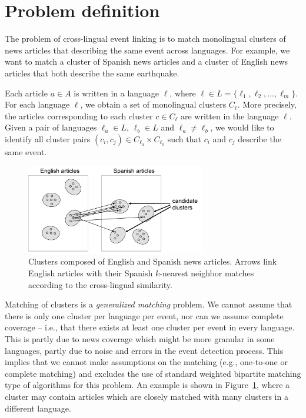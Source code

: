 \section{Problem definition}

The problem of cross-lingual event linking is to match monolingual clusters of news articles
that describing the same event across languages. For example, we want to match a cluster of
Spanish news articles and a cluster of English news articles that both describe the same earthquake.

Each article $a \in A$ is written in a language $\ell$, where $\ell \in L = \{\ell_1,\ell_2,...,\ell_m\}$.
For each language $\ell$, we obtain a set of monolingual clusters $C_{\ell}$. More precisely,
the articles corresponding to each cluster $c \in C_{\ell}$ are written in the language $\ell$.
Given a pair of languages $\ell_a \in L$, $\ell_b \in L$ and $\ell_a \not= \ell_b$, we would like
to identify all cluster pairs $(c_i, c_j) \in C_{\ell_a} \times C_{\ell_b}$ such that $c_i$ and $c_j$ describe the same event.

\begin{figure}[tb]
\centering
\includegraphics[width=0.7\textwidth]{figures/clusters.pdf}
\caption{\label{fig:clusters} Clusters composed of English and Spanish news articles. Arrows link English articles with their Spanish $k$-nearest neighbor matches according to the cross-lingual similarity.}
\end{figure}

Matching of clusters is a \emph{generalized matching} problem. We cannot assume that there is only
one cluster per language per event, nor can we assume complete coverage -- i.e., that there exists
at least one cluster per event in every language. This is partly due to news coverage which might
be more granular in some languages, partly due to noise and errors in the event detection process. This
implies that we cannot make assumptions on the matching (e.g., one-to-one or complete matching) and excludes
the use of standard weighted bipartite matching type of algorithms for this problem. An example is shown in
Figure~\ref{fig:clusters}, where a cluster may contain articles which are closely matched with many clusters in a different language.

